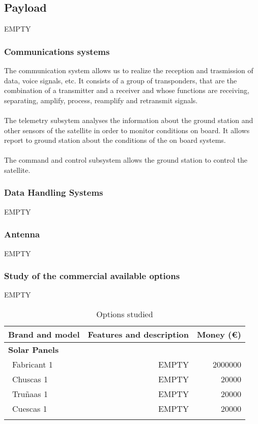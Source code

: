 \subsection{Payload}

EMPTY

\subsubsection{Communications systems}
The communication system allows us to realize the reception and trasmission of data, voice signals, etc. It consists of a group of transponders, that are the combination of a transmitter and a receiver and whose functions are receiving, separating, amplify, process, reamplify and retransmit signals.
	\paragraph{} 
	The telemetry subsytem analyses the information about the ground station and other sensors of the satellite in 	order to monitor conditions on board. It allows report to ground station about the conditions of the on board 			systems.
	\paragraph{} 
	The command and control subsystem allows the ground station to control the satellite.
\subsubsection{Data Handling Systems}
EMPTY
\subsubsection{Antenna}
EMPTY

\subsubsection{Study of the commercial available options}
EMPTY
\begin{longtable}{| l | r | r | }
	\hline
	\rowcolor[gray]{0.80}	\textbf{Brand and model} &  \textbf{Features and description}     & \textbf{Money (\euro)}   \\
	\hline
	\endfirsthead
	
	\rowcolor[gray]{0.85} \textbf{Solar Panels} &  &  \\
	~Fabricant 1 & EMPTY & 2000000 \\
	~Chuscas 1 & EMPTY & 20000 \\
	~Truñaas 1 & EMPTY & 20000 \\
	~Cuescas 1 & EMPTY & 20000 \\
	\hline
	
	\caption{Options studied}
	\label{epsoptionstable}
\end{longtable}

